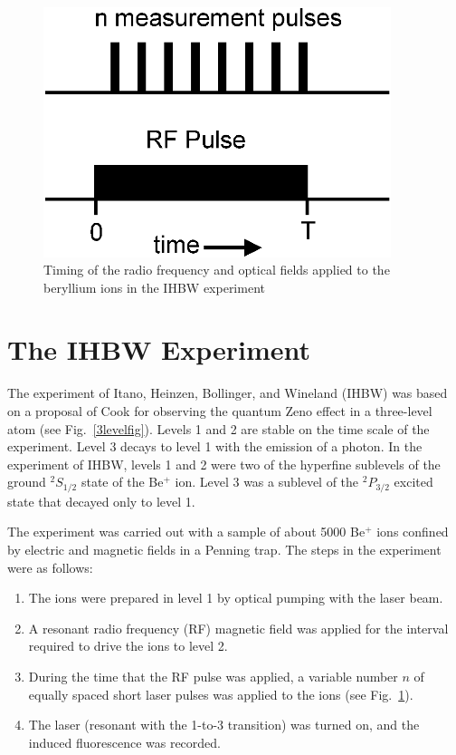 \documentclass[letterpaper]{jpconf}
\begin{document}
\begin{figure}[htb]
\begin{center}
\includegraphics[width=4in]{timing2.eps}
\end{center}
\caption{\label{pulsefig}Timing of the radio frequency and optical
fields applied to the beryllium ions in the IHBW experiment}
\end{figure}



\section{The IHBW Experiment}

The experiment of Itano, Heinzen, Bollinger, and Wineland (IHBW)
\cite{itano90} was based on a proposal of Cook \cite{cook88} for
observing the quantum Zeno effect in a three-level atom (see
Fig.~\ref{3levelfig}).  Levels 1 and 2 are stable on the time scale
of the experiment.  Level 3 decays to level 1 with the emission of a
photon.  In the experiment of IHBW, levels 1 and 2 were two of the
hyperfine sublevels of the ground $^2S_{1/2}$ state of the Be$^+$
ion. Level 3 was a sublevel of the $^2P_{3/2}$ excited state that
decayed only to level 1.

The experiment was carried out with a sample of about 5000 Be$^+$
ions confined by electric and magnetic fields in a Penning trap. The
steps in the experiment were as follows:
\begin{enumerate}
\item{The ions were prepared in level 1 by optical pumping with the
laser beam.}
\item{A resonant radio frequency (RF) magnetic field was applied for
the interval required to drive the ions to level 2.}
\item{During the time that the RF pulse was applied, a variable
number $n$ of equally spaced short laser pulses was applied to the
ions (see Fig.~\ref{pulsefig}).}
\item{The laser (resonant with the 1-to-3 transition) was turned on,
and the induced fluorescence was recorded.}
\end{enumerate}
\end{document}
